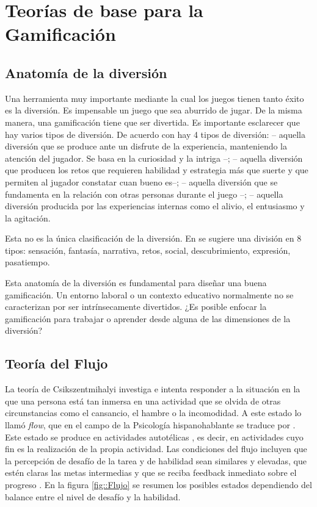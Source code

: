 \section{Teorías de base para la Gamificación}

\subsection{Anatomía de la diversión}

Una herramienta muy importante mediante la cual los juegos tienen tanto éxito es la diversión.
%
Es impensable un juego que sea aburrido de jugar.
%
De la misma manera, una gamificación tiene que ser divertida.
%
Es importante esclarecer que hay varios tipos de diversión.
%
De acuerdo con  \cite{whyweplaygames} hay 4 tipos de diversión: 
%
 -- aquella diversión que se produce ante un disfrute de la experiencia, manteniendo la atención del jugador. Se basa en la curiosidad y la intriga --;
%
\label{kindsoffun}
  -- aquella diversión que producen los retos que requieren habilidad y estrategia más que suerte y que permiten al jugador constatar cuan bueno es--;
%
 -- aquella diversión que se fundamenta en la relación con otras personas durante el juego --;
%
 -- aquella diversión producida por las experiencias internas como el alivio, el entusiasmo y la agitación.

Esta no es la única clasificación de la diversión.
%
En \cite{MDA} se sugiere una división en 8 tipos: sensación, fantasía, narrativa, retos, social, descubrimiento, expresión, pasatiempo.
%
\label{AnatomyOfFun}
%

Esta anatomía de la diversión es fundamental para diseñar una buena gamificación.
%
Un entorno laboral o un contexto educativo normalmente no se caracterizan por ser intrínsecamente divertidos.
%
¿Es posible enfocar la gamificación para trabajar o aprender desde alguna de las dimensiones de la diversión? 


\subsection{Teoría del Flujo} 

La teoría de Csikszentmihalyi investiga e intenta responder a la situación en la que una persona está tan inmersa en una actividad que se olvida de otras circunstancias como el cansancio, el hambre o la incomodidad.
%
A este estado lo llamó \textit{flow}, que en el campo de la Psicología hispanohablante se traduce por .
%
Este estado se produce en actividades autotélicas \label{autotel}, es decir, en actividades cuyo fin es la realización de la propia actividad.
%
Las condiciones del flujo incluyen que la percepción de desafío de la tarea y de habilidad sean similares y elevadas, que estén claras las metas intermedias y que se reciba feedback inmediato sobre el progreso \citep{Flow}.
%
En la figura \ref{fig::Flujo} se resumen los posibles estados dependiendo del balance entre el nivel de desafío y la habilidad.

